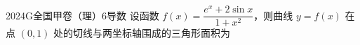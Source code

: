
\begin{problem}{2024}{G}{全国甲卷（理）}{6}{导数}
设函数 $f(x)=\dfrac{e^x+2\sin x}{1+x^2}$，则曲线 $y=f(x)$ 在点 $(0,1)$ 处的切线与两坐标轴围成的三角形面积为
\begin{choices}
\end{choices}
\end{problem}
